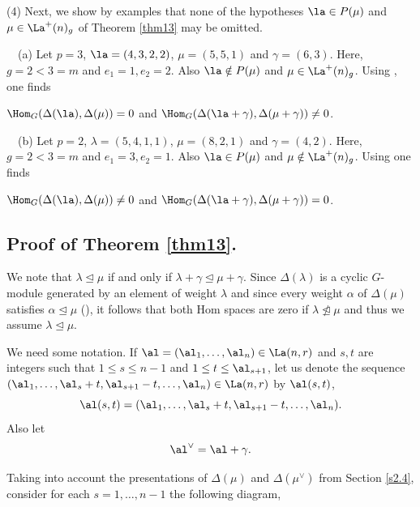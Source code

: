 \begin{exams}
		(4) Next, we show by examples that none of the hypotheses $\la \in P(\mu)$ and $ \mu \in \La^{+}(n)_g$ of Theorem \ref{thm13} may be omitted.
		
		\ \ (a) Let $p=3$, $\la=(4,3,2,2)$, $\mu=(5,5,1)$ and $\gamma=(6, 3)$. Here, $g=2<3=m$ and $e_1=1, e_2=2$. Also $\la \notin P(\mu)$ and $\mu \in \La^{+}(n)_g$. Using \cite{FGAP}, one finds  \begin{center}
			$\Hom_G(\Delta(\la),\Delta(\mu))=0$ and $\Hom_{G}(\Delta(\la+\gamma), \Delta(\mu+\gamma)) \neq 0$.
		\end{center}
		
		\ \ (b) Let $p=2$, $\lambda = (5,4,1,1)$, $\mu=(8,2,1)$ and $\gamma = (4,2)$. Here, $g=2<3=m$ and $e_1=3, e_2=1$. Also $\la \in P(\mu)$ and $\mu \notin \La^{+}(n)_g$. Using \cite{FGAP} one finds \begin{center}
			$\Hom_G(\Delta(\la),\Delta(\mu)) \neq 0$ and $\Hom_{G}(\Delta(\la+\gamma), \Delta(\mu+\gamma)) = 0$.
		\end{center}
	\end{exams}

	\subsection{Proof of Theorem \ref{thm13}.} \label{s4.2} We note that $\lambda \unlhd \mu$ if and only if $\lambda +\gamma \unlhd \mu + \gamma$. Since $\Delta{(\lambda)}$ is a cyclic $G$-module generated by an element of weight $\lambda$ and since every weight $\alpha$ of $\Delta(\mu)$ satisfies $\alpha \unlhd \mu$ (\cite[II 2.2 Prop]{Jan}), it follows that both Hom spaces are zero if $\lambda \ntrianglelefteq \mu$ and thus we assume $\lambda \unlhd \mu$.

We need some notation. If $\al=(\al_1,\dots,\al_n) \in \La(n,r)$ and $s, t$ are integers such that $1 \le s \le n-1$ and $1 \le t \le \al_{s+1} $, let us denote the sequence $(\al_1,\dots,\al_s+t, \al_{s+1}-t,\dots,\al_n) \in \La(n,r)$ by $\al({s,t})$, \[\al({s,t}) = (\al_1,\dots,\al_s+t, \al_{s+1}-t,\dots,\al_n). \] Also let \[\al^{\vee} =\al+\gamma.\]

Taking into account the presentations of $\Delta(\mu)$ and $\Delta(\mu ^{\vee})$ from Section \ref{s2.4}, consider for each $s=1,\dots,n-1$ the following diagram,

